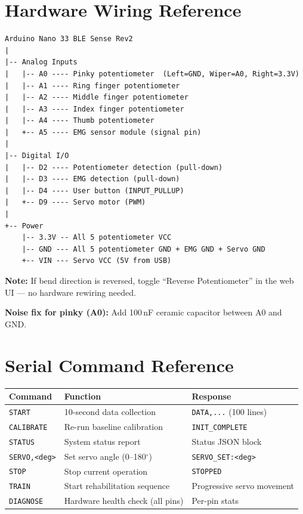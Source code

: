 \documentclass[12pt,a4paper]{article}
\begin{document}
\section{Hardware Wiring Reference}

\begin{lstlisting}[style=plainstyle]
Arduino Nano 33 BLE Sense Rev2
|
|-- Analog Inputs
|   |-- A0 ---- Pinky potentiometer  (Left=GND, Wiper=A0, Right=3.3V)
|   |-- A1 ---- Ring finger potentiometer
|   |-- A2 ---- Middle finger potentiometer
|   |-- A3 ---- Index finger potentiometer
|   |-- A4 ---- Thumb potentiometer
|   +-- A5 ---- EMG sensor module (signal pin)
|
|-- Digital I/O
|   |-- D2 ---- Potentiometer detection (pull-down)
|   |-- D3 ---- EMG detection (pull-down)
|   |-- D4 ---- User button (INPUT_PULLUP)
|   +-- D9 ---- Servo motor (PWM)
|
+-- Power
    |-- 3.3V -- All 5 potentiometer VCC
    |-- GND --- All 5 potentiometer GND + EMG GND + Servo GND
    +-- VIN --- Servo VCC (5V from USB)
\end{lstlisting}

\textbf{Note:} If bend direction is reversed, toggle ``Reverse Potentiometer'' in the web UI --- no hardware rewiring needed.

\textbf{Noise fix for pinky (A0):} Add 100\,nF ceramic capacitor between A0 and GND.

\section{Serial Command Reference}

\begin{center}
\begin{tabular}{@{}p{3.5cm} p{5.5cm} p{4.5cm}@{}}
\toprule
\textbf{Command} & \textbf{Function} & \textbf{Response} \\
\midrule
\texttt{START}        & 10-second data collection & \texttt{DATA,...} (100 lines) \\
\texttt{CALIBRATE}    & Re-run baseline calibration & \texttt{INIT\_COMPLETE} \\
\texttt{STATUS}       & System status report & Status JSON block \\
\texttt{SERVO,<deg>}  & Set servo angle (0--180$^\circ$) & \texttt{SERVO\_SET:<deg>} \\
\texttt{STOP}         & Stop current operation & \texttt{STOPPED} \\
\texttt{TRAIN}        & Start rehabilitation sequence & Progressive servo movement \\
\texttt{DIAGNOSE}     & Hardware health check (all pins) & Per-pin stats \\
\bottomrule
\end{tabular}
\end{center}
\end{document}

